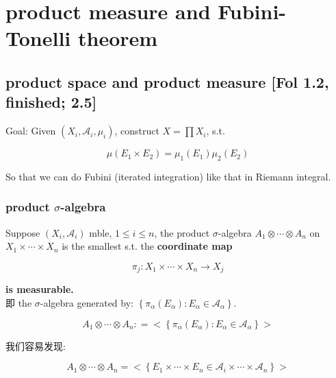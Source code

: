 \chapter{product measure and Fubini-Tonelli theorem}\label{product-measure-and-fubini-tonelli-theorem}

\section{product space and product measure {[}Fol 1.2, finished; 2.5{]}}

Goal: Given \((X_{i},\mathcal{A}_{i},\mu_{i})\), construct \(X = \prod X_{i}\), s.t.

\[\mu(E_{1} \times E_{2}) = \mu_{1}(E_{1})\mu_{2}(E_{2})\]

So that we can do Fubini (iterated integration) like that in Riemann integral.

\subsection{\texorpdfstring{product \(\sigma\)-algebra}{product \textbackslash sigma-algebra}}\label{product-sigma-algebra}

\begin{definition}{}

Suppose \((X_{i},\mathcal{A}_{i})\) mble, \(1 \leq i \leq n\), the product \(\sigma\)-algebra \(A_{1} \otimes \cdots \otimes A_{n}\) on \(X_{1} \times \cdots \times X_{n}\) is the smallest  s.t. the \textbf{coordinate map}

\[\pi_{j}:X_{1} \times \cdots \times X_{n}\rightarrow X_{j}\]

\textbf{is measurable.}\\
即 the \(\sigma\)-algebra generated by: \(\left\{ {\pi_{\alpha}(E_{\alpha}):E_{\alpha} \in \mathcal{A}_{\alpha}} \right\}\).

\[A_{1} \otimes \cdots \otimes A_{n}: = < \left\{ {\pi_{\alpha}(E_{\alpha}):E_{\alpha} \in \mathcal{A}_{\alpha}} \right\} >\]

\end{definition}

我们容易发现:

\begin{proposition}

\[A_{1} \otimes \cdots \otimes A_{n} = < \left\{ {E_{1} \times \cdots \times E_{n} \in \mathcal{A}_{i} \times \cdots \times \mathcal{A}_{n}} \right\} >\]

\end{proposition}


